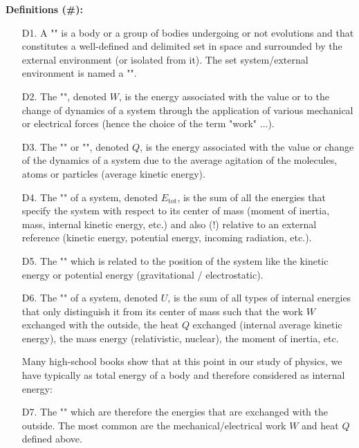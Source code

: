 	\textbf{Definitions (\#\mydef):}
	\begin{enumerate}
		\item[D1.] A "" is a body or a group of bodies undergoing or not evolutions and that constitutes a well-defined and delimited set in space and surrounded by the external environment (or isolated from it). The set system/external environment is named a "".
		
		\item[D2.] The "", denoted $W$, is the energy associated with the value or to the change of dynamics of a system through the application of various mechanical or electrical forces (hence the choice of the term "work" ...).
		
		\item[D3.] The "" or "", denoted $Q$, is the energy associated with the value or change of the dynamics of a system due to the average agitation of the molecules, atoms or particles (average kinetic energy).
		
		\item[D4.] The "" of a system, denoted $E_\text{tot}$, is the sum of all the energies that specify the system with respect to its center of mass (moment of inertia, mass, internal kinetic energy, etc.) and also  (!) relative to an external reference (kinetic energy, potential energy, incoming radiation, etc.).
		
		\item[D5.] The "" which is related to the position of the system like the kinetic energy or potential energy (gravitational / electrostatic).
		
		\item[D6.] The "" of a system, denoted $U$, is the sum of all types of internal energies that only distinguish it from its center of mass such that the work $W$ exchanged with the outside, the heat $Q$ exchanged (internal average kinetic energy), the mass energy (relativistic, nuclear), the moment of inertia, etc.
		
		Many high-school books show that at this point in our study of physics, we have typically as total energy of a body and therefore considered as internal energy:
		
		
		\item[D7.] The "" which are therefore the energies that are exchanged with the outside. The most common are the mechanical/electrical work $W$ and heat $Q$ defined above.
		

\end{enumerate}
